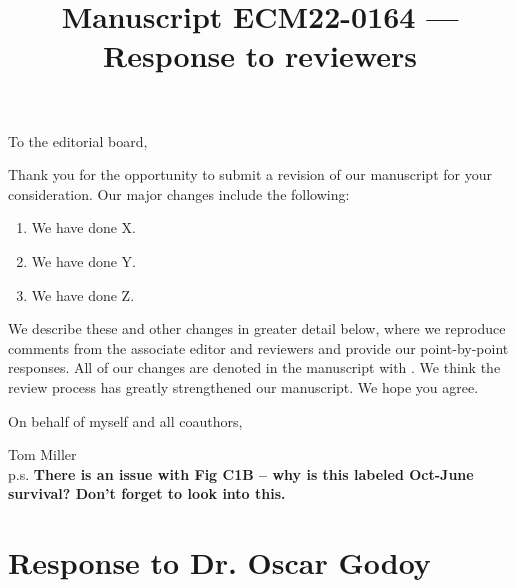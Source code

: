\documentclass[12pt]{article}
\newcommand{\revise}[1]{{\color{Mahogany}{#1}}}
\begin{document}
\title{Manuscript ECM22-0164 --- Response to reviewers}

\maketitle
\noindent To the editorial board,

Thank you for the opportunity to submit a revision of our manuscript for your consideration. Our major changes include the following:
\begin{enumerate}
	\item We have done X.
	\item We have done Y.
	\item We have done Z.
\end{enumerate}

We describe these and other changes in greater detail below, where we reproduce comments from the associate editor and reviewers and provide our point-by-point responses. 
All of our changes are denoted in the manuscript with \revise{Mahogany font}.
We think the review process has greatly strengthened our manuscript.
We hope you agree. 

\vspace{2em}
\hfill On behalf of myself and all coauthors,

\hfill Tom Miller
\\p.s. \textbf{There is an issue with Fig C1B -- why is this labeled Oct-June survival? Don't forget to look into this.}
\newpage

\section{Response to Dr. Oscar Godoy}
\vspace{-2em}
\end{document}
